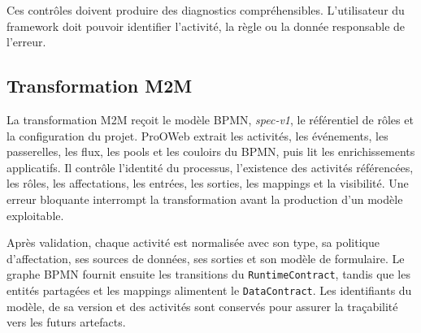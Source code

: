 

Ces contrôles doivent produire des diagnostics compréhensibles. L'utilisateur du framework doit pouvoir identifier l'activité, la règle ou la donnée responsable de l'erreur.

\subsection{Transformation M2M}

La transformation M2M reçoit le modèle BPMN, \textit{spec-v1}, le référentiel
de rôles et la configuration du projet. ProOWeb extrait les activités, les
événements, les passerelles, les flux, les pools et les couloirs du BPMN, puis
lit les enrichissements applicatifs. Il contrôle l'identité du processus,
l'existence des activités référencées, les rôles, les affectations, les
entrées, les sorties, les mappings et la visibilité. Une erreur bloquante
interrompt la transformation avant la production d'un modèle exploitable.

Après validation, chaque activité est normalisée avec son type, sa politique
d'affectation, ses sources de données, ses sorties et son modèle de formulaire.
Le graphe BPMN fournit ensuite les transitions du \texttt{RuntimeContract},
tandis que les entités partagées et les mappings alimentent le
\texttt{DataContract}. Les identifiants du modèle, de sa version et des
activités sont conservés pour assurer la traçabilité vers les futurs artefacts.

